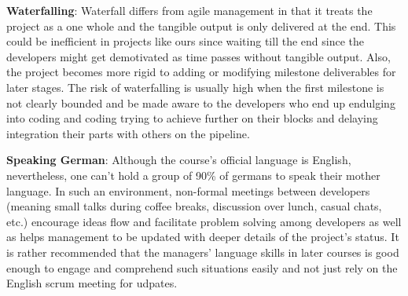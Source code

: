 \item \textbf{Waterfalling}: Waterfall differs from agile management in that it treats the project as a one whole and the tangible output is only delivered at the end. This could be inefficient in projects like ours since waiting till the end since the developers might get demotivated as time passes without tangible output. Also, the project becomes more rigid to adding or modifying milestone deliverables for later stages. The risk of waterfalling is usually high when the first milestone is not clearly bounded and be made aware to the developers who end up endulging into coding and coding trying to achieve further on their blocks and delaying integration their parts with others on the pipeline.
\item \textbf{Speaking German}: Although the course's official language is English, nevertheless, one can't hold a group of 90\% of germans to speak their mother language. In such an environment, non-formal meetings between developers (meaning small talks during coffee breaks, discussion over lunch, casual chats, etc.) encourage ideas flow and facilitate problem solving among developers as well as helps management to be updated with deeper details of the project's status. It is rather recommended that the managers' language skills in later courses is good enough to engage and comprehend such situations easily and not just rely on the English scrum meeting for udpates.

